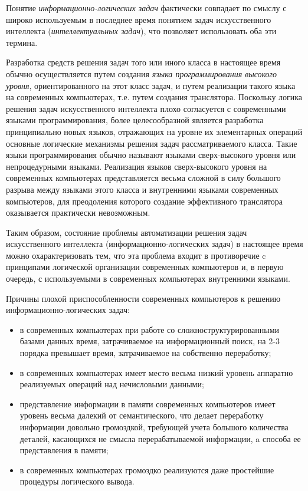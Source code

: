
\begin{SCn}
\end{SCn}

Понятие \textit{информационно-логических задач} фактически совпадает по смыслу с широко используемым в последнее время понятием задач искусственного интеллекта (\textit{интеллектуальных задач}), что позволяет использовать оба эти термина.

Разработка средств решения задач того или иного класса в настоящее время обычно осуществляется путем создания \textit{языка программирования высокого уровня}, ориентированного на этот класс задач, и путем реализации такого языка на современных компьютерах, т.е. путем создания транслятора. Поскольку логика решения задач искусственного интеллекта плохо согласуется с современными языками программирования, более целесообразной является разработка принципиально новых языков, отражающих на уровне их элементарных операций основные логические механизмы решения задач рассматриваемого класса. Такие языки программирования обычно называют языками сверх-высокого уровня или непроцедурными языками. Реализация языков сверх-высокого уровня на современных компьютерах представляется весьма сложной в силу большого разрыва между языками этого класса и внутренними языками современных компьютеров, для преодоления которого создание эффективного транслятора оказывается практически невозможным.

Таким образом, состояние проблемы автоматизации решения задач искусственного интеллекта (информационно-логических задач) в настоящее время можно охарактеризовать тем, что эта проблема входит в противоречие c принципами логической организации современных компьютеров и, в первую очередь, с используемыми в современных компьютерах внутренними языками. 
	
Причины плохой приспособленности современных компьютеров к решению информационно-логических задач:
\begin{itemize}
	\item в современных компьютерах при работе со сложноструктурированными базами данных время, затрачиваемое на информационный поиск, на 2-3 порядка превышает время, затрачиваемое на собственно переработку;
	\item в современных компьютерах имеет место весьма низкий уровень аппаратно реализуемых операций над нечисловыми данными;
	\item представление информации в памяти современных компьютеров имеет уровень весьма далекий от семантического, что делает переработку информации довольно громоздкой, требующей учета большого количества деталей, касающихся не смысла перерабатываемой информации, a способа ее представления в памяти;
	\item в современных компьютерах громоздко реализуются даже простейшие процедуры логического вывода.
\end{itemize}
	
